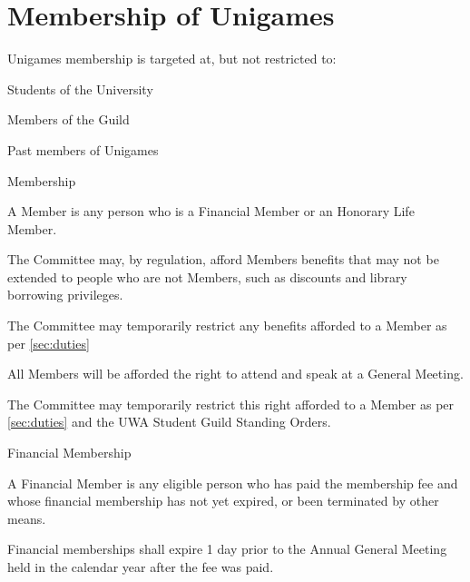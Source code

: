 \documentclass[a4paper]{article}
\begin{document}
\section{Membership of Unigames} \label{sec:membership}
\begin{myEnumerate}
    \item Unigames membership is targeted at, but not restricted to:
          \begin{myEnumerate}
              \item Students of the University
              \item Members of the Guild
              \item Past members of Unigames
          \end{myEnumerate}
    \item Membership
        \begin{myEnumerate}
            \item A Member is any person who is a Financial Member or an Honorary Life Member.
            \item The Committee may, by regulation, afford Members benefits that may not be extended to people who are not Members, such as discounts and library borrowing privileges.
            \begin{myEnumerate}
                \item The Committee may temporarily restrict any benefits afforded to a Member as per \cref{sec:duties}
            \end{myEnumerate}
            \item All Members will be afforded the right to attend and speak at a General Meeting.
              \begin{myEnumerate}
                  \item The Committee may temporarily restrict this right afforded to a Member as per \cref{sec:duties} and the UWA Student Guild Standing Orders.
              \end{myEnumerate}
        \end{myEnumerate}
    \item Financial Membership
        \begin{myEnumerate}
            \item A Financial Member is any eligible person who has paid the membership fee and whose financial membership has not yet expired, or been terminated by other means.
                \begin{myEnumerate}
                    \item Financial memberships shall expire 1 day prior to the Annual General Meeting held in the calendar year after the fee was paid.

\end{myEnumerate}
\end{myEnumerate}
\end{myEnumerate}
\end{document}
